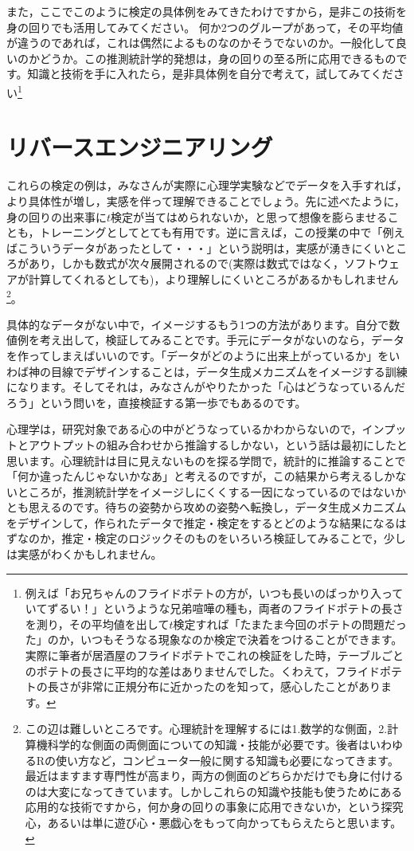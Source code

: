 \documentclass{ltjsarticle}
\begin{document}
また，ここでこのように検定の具体例をみてきたわけですから，是非この技術を身の回りでも活用してみてください。
何か2つのグループがあって，その平均値が違うのであれば，これは偶然によるものなのかそうでないのか。一般化して良いのかどうか。この推測統計学的発想は，身の回りの至る所に応用できるものです。知識と技術を手に入れたら，是非具体例を自分で考えて，試してみてください\footnote{例えば「お兄ちゃんのフライドポテトの方が，いつも長いのばっかり入っていてずるい！」というような兄弟喧嘩の種も，両者のフライドポテトの長さを測り，その平均値を出して$t$検定すれば「たまたま今回のポテトの問題だった」のか，いつもそうなる現象なのか検定で決着をつけることができます。実際に筆者が居酒屋のフライドポテトでこれの検証をした時，テーブルごとのポテトの長さに平均的な差はありませんでした。くわえて，フライドポテトの長さが非常に正規分布に近かったのを知って，感心したことがあります。}

\section{リバースエンジニアリング}
これらの検定の例は，みなさんが実際に心理学実験などでデータを入手すれば，より具体性が増し，実感を伴って理解できることでしょう。先に述べたように，身の回りの出来事に$t$検定が当てはめられないか，と思って想像を膨らませることも，トレーニングとしてとても有用です。逆に言えば，この授業の中で「例えばこういうデータがあったとして・・・」という説明は，実感が湧きにくいところがあり，しかも数式が次々展開されるので(実際は数式ではなく，ソフトウェアが計算してくれるとしても)，より理解しにくいところがあるかもしれません\footnote{この辺は難しいところです。心理統計を理解するには1.数学的な側面，2.計算機科学的な側面の両側面についての知識・技能が必要です。後者はいわゆるRの使い方など，コンピュータ一般に関する知識も必要になってきます。最近はますます専門性が高まり，両方の側面のどちらかだけでも身に付けるのは大変になってきています。しかしこれらの知識や技能も使うためにある応用的な技術ですから，何か身の回りの事象に応用できないか，という探究心，あるいは単に遊び心・悪戯心をもって向かってもらえたらと思います。}。

具体的なデータがない中で，イメージするもう1つの方法があります。自分で数値例を考え出して，検証してみることです。手元にデータがないのなら，データを作ってしまえばいいのです。「データがどのように出来上がっているか」をいわば神の目線でデザインすることは，データ生成メカニズムをイメージする訓練になります。そしてそれは，みなさんがやりたかった「心はどうなっているんだろう」という問いを，直接検証する第一歩でもあるのです。

心理学は，研究対象である心の中がどうなっているかわからないので，インプットとアウトプットの組み合わせから推論するしかない，という話は最初にしたと思います。心理統計は目に見えないものを探る学問で，統計的に推論することで「何か違ったんじゃないかなあ」と考えるのですが，この結果から考えるしかないところが，推測統計学をイメージしにくくする一因になっているのではないかとも思えるのです。待ちの姿勢から攻めの姿勢へ転換し，データ生成メカニズムをデザインして，作られたデータで推定・検定をするとどのような結果になるはずなのか，推定・検定のロジックそのものをいろいろ検証してみることで，少しは実感がわくかもしれません。
\end{document}
